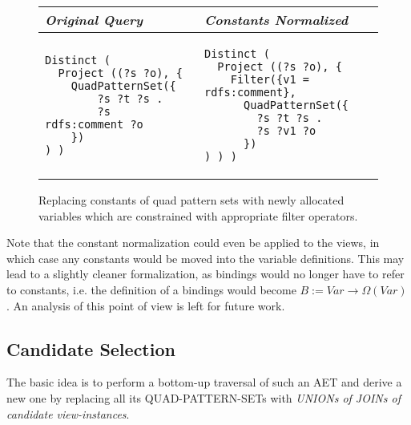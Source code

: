 \documentclass[a4paper,twoside,bibtotoc,abstracton,12pt,BCOR=15mm]{scrreprt}
\begin{document}
\begin{figure}[!h]
\centering
\begin{tabular}{ll}
\toprule
\emph{Original Query} & \emph{Constants Normalized} \\ 
\midrule

\begin{minipage}{6cm}
\begin{scriptsize}
\begin{verbatim}
Distinct (
  Project ((?s ?o), {
    QuadPatternSet({
        ?s ?t ?s .
        ?s rdfs:comment ?o
    })
) )
\end{verbatim}
\end{scriptsize}
\end{minipage}

&

\begin{minipage}{6cm}
\begin{scriptsize}
\begin{verbatim}
Distinct (
  Project ((?s ?o), {
    Filter({v1 = rdfs:comment},
      QuadPatternSet({
        ?s ?t ?s .
        ?s ?v1 ?o
      })
) ) )
\end{verbatim}
\end{scriptsize}
\end{minipage}

\\

\bottomrule
\end{tabular}
\caption{Replacing constants of quad pattern sets with newly allocated variables which are constrained with appropriate filter operators.}
\label{fig:constant-removal}
\end{figure}

Note that the constant normalization could even be applied to the views, in which case any constants would be moved into the variable definitions.
This may lead to a slightly cleaner formalization, as bindings would no longer have to refer to constants, i.e. the definition of a
bindings would become $B := Var \rightarrow  \Omega{ \left ( Var \right ) }$.
An analysis of this point of view is left for future work.  


\subsection{Candidate Selection}
The basic idea is to perform a bottom-up traversal of such an AET and derive a new one by replacing all its QUAD-PATTERN-SETs with \emph{UNIONs of JOINs of candidate view-instances}.
\end{document}
